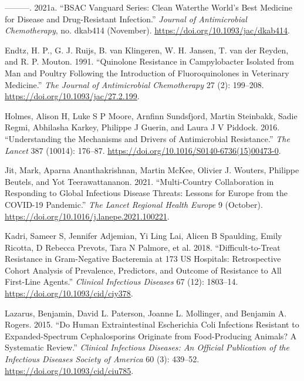 \documentclass[]{tufte-handout}
\newlength{\cslhangindent}
\newenvironment{CSLReferences}[3] %
 {%
  \setlength{\parindent}{0pt}
  \ifodd #1 \everypar{\setlength{\hangindent}{\cslhangindent}}\ignorespaces\fi
  \ifnum #2 > 0
  \setlength{\parskip}{#2\baselineskip}
  \fi
 }%
 {}
\begin{document}
\begin{CSLReferences}{1}{0}
\leavevmode{}%
---------. 2021a. {``{BSAC Vanguard Series}: Clean Water\textemdash the
World's Best Medicine for Disease and Drug-Resistant Infection.''}
\emph{Journal of Antimicrobial Chemotherapy}, no. dkab414 (November).
\url{https://doi.org/10.1093/jac/dkab414}.

\leavevmode{}%
Endtz, H. P., G. J. Ruijs, B. van Klingeren, W. H. Jansen, T. van der
Reyden, and R. P. Mouton. 1991. {``Quinolone Resistance in Campylobacter
Isolated from Man and Poultry Following the Introduction of
Fluoroquinolones in Veterinary Medicine.''} \emph{The Journal of
Antimicrobial Chemotherapy} 27 (2): 199--208.
\url{https://doi.org/10.1093/jac/27.2.199}.

\leavevmode{}%
Holmes, Alison H, Luke S P Moore, Arnfinn Sundsfjord, Martin Steinbakk,
Sadie Regmi, Abhilasha Karkey, Philippe J Guerin, and Laura J V Piddock.
2016. {``Understanding the Mechanisms and Drivers of Antimicrobial
Resistance.''} \emph{The Lancet} 387 (10014): 176--87.
\url{https://doi.org/10.1016/S0140-6736(15)00473-0}.

\leavevmode{}%
Jit, Mark, Aparna Ananthakrishnan, Martin McKee, Olivier J. Wouters,
Philippe Beutels, and Yot Teerawattananon. 2021. {``Multi-Country
Collaboration in Responding to Global Infectious Disease Threats:
Lessons for {Europe} from the {COVID}-19 Pandemic.''} \emph{The Lancet
Regional Health \textendash{} Europe} 9 (October).
\url{https://doi.org/10.1016/j.lanepe.2021.100221}.

\leavevmode{}%
Kadri, Sameer S, Jennifer Adjemian, Yi Ling Lai, Alicen B Spaulding,
Emily Ricotta, D Rebecca Prevots, Tara N Palmore, et al. 2018.
{``Difficult-to-{Treat Resistance} in {Gram}-Negative {Bacteremia} at
173 {US Hospitals}: Retrospective {Cohort Analysis} of {Prevalence},
{Predictors}, and {Outcome} of {Resistance} to {All First}-Line
{Agents}.''} \emph{Clinical Infectious Diseases} 67 (12): 1803--14.
\url{https://doi.org/10.1093/cid/ciy378}.

\leavevmode{}%
Lazarus, Benjamin, David L. Paterson, Joanne L. Mollinger, and Benjamin
A. Rogers. 2015. {``Do Human Extraintestinal {Escherichia} Coli
Infections Resistant to Expanded-Spectrum Cephalosporins Originate from
Food-Producing Animals? A Systematic Review.''} \emph{Clinical
Infectious Diseases: An Official Publication of the Infectious Diseases
Society of America} 60 (3): 439--52.
\url{https://doi.org/10.1093/cid/ciu785}.


\end{CSLReferences}
\end{document}
